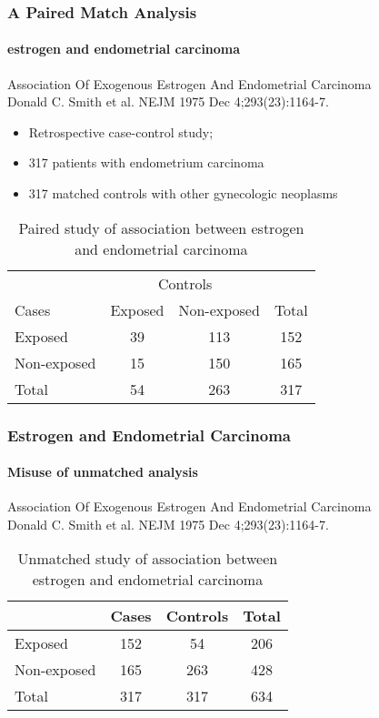 \documentclass[table,10pt]{beamer}
\begin{document}
\begin{CJK*}{UTF8}{gbsn}
\begin{frame}[t]
\frametitle{A Paired Match Analysis}
\framesubtitle{estrogen and endometrial carcinoma}
{\large \alert{Association Of Exogenous Estrogen And Endometrial Carcinoma}}\\
\small{Donald C. Smith et al. NEJM 1975 Dec 4;293(23):1164-7.}
\begin{itemize}
	\item Retrospective case-control study;
	\item 317 patients with endometrium carcinoma
	\item 317 matched controls with other gynecologic neoplasms
\end{itemize}
\begin{table}
\renewcommand\arraystretch{1.2}
\small
\caption{Paired study of association between estrogen and endometrial carcinoma}
\begin{tabular}{lccc}
\hline
 & \multicolumn{2}{c}{Controls} & \\
\cline{2-3}
Cases & Exposed & Non-exposed & Total\\
\hline
Exposed & 39 & \alert{113} & 152\\
Non-exposed & \alert{15} & 150 & 165\\
\hline
Total & 54 & 263 & 317
\end{tabular}
\end{table}
\end{frame}


\begin{frame}[t]
\frametitle{Estrogen and Endometrial Carcinoma}
\framesubtitle{Misuse of unmatched analysis}
{\large \alert{Association Of Exogenous Estrogen And Endometrial Carcinoma}}\\
\small{Donald C. Smith et al. NEJM 1975 Dec 4;293(23):1164-7.}
\begin{table}
\renewcommand\arraystretch{1.2}
\footnotesize
\caption{Unmatched study of association between estrogen and endometrial carcinoma}
\begin{tabular}{lccc}
\hline
 & Cases & Controls & Total\\
\hline
Exposed & 152 & 54 & 206\\
Non-exposed & 165 & 263 & 428\\
\hline
Total & 317 & 317 & 634
\end{tabular}
\end{table}
\end{frame}


\end{CJK*}
\end{document}
